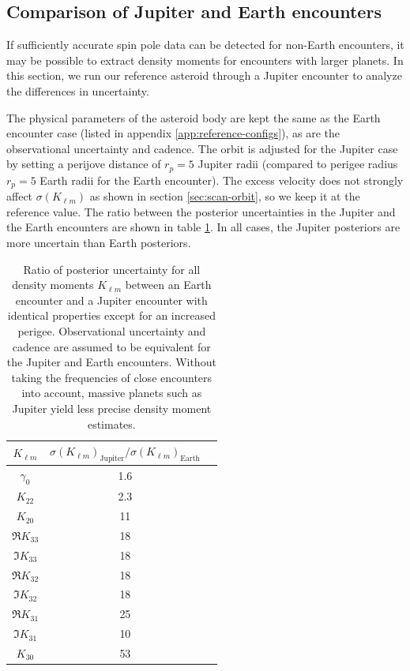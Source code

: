 \documentclass[fleqn,usenatbib]{mnras}
\begin{document}
\subsection{Comparison of Jupiter and Earth encounters}
\label{sec:jupiter-earth}

If sufficiently accurate spin pole data can be detected for non-Earth encounters, it may be possible to extract density moments for encounters with larger planets. In this section, we run our reference asteroid through a Jupiter encounter to analyze the differences in uncertainty.

The physical parameters of the asteroid body are kept the same as the Earth encounter case (listed in appendix \ref{app:reference-configs}), as are the observational uncertainty and cadence. The orbit is adjusted for the Jupiter case by setting a perijove distance of $r_p=5$ Jupiter radii (compared to perigee radius $r_p=5$ Earth radii for the Earth encounter). The excess velocity does not strongly affect $\sigma(K_{\ell m})$ as shown in section \ref{sec:scan-orbit}, so we keep it at the reference value.
The ratio between the posterior uncertainties in the Jupiter and the Earth encounters are shown in table \ref{tab:jupiter-uncertainty}. In all cases, the Jupiter posteriors are more uncertain than Earth posteriors.

\begin{table}
  \centering
  \begin{tabular}{c|cc}
    \hline 
    $K_{\ell m}$ & $\sigma(K_{\ell m})_\text{Jupiter}/\sigma(K_{\ell m})_\text{Earth}$\\ \hline 
    $\gamma_0$ & 1.6 \\
    $K_{22}$ & 2.3 \\
    $K_{20}$ & 11 \\
    $\Re K_{33}$ & 18 \\
    $\Im K_{33}$ & 18 \\
    $\Re K_{32}$ & 18 \\
    $\Im K_{32}$ & 18 \\
    $\Re K_{31}$ & 25 \\
    $\Im K_{31}$ & 10 \\
    $K_{30}$ & 53 \\ \hline
  \end{tabular}
  \caption{Ratio of posterior uncertainty for all density moments $K_{\ell m}$ between an Earth encounter and a Jupiter encounter with identical properties except for an increased perigee. Observational uncertainty and cadence are assumed to be equivalent for the Jupiter and Earth encounters. Without taking the frequencies of close encounters into account, massive planets such as Jupiter yield less precise density moment estimates.}
  \label{tab:jupiter-uncertainty}
\end{table}
\end{document}

